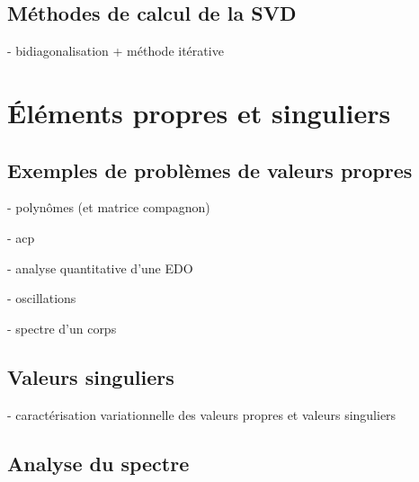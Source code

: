 \subsection{Méthodes de calcul de la SVD}

- bidiagonalisation + méthode itérative




\section{Éléments propres et singuliers}

\subsection{Exemples de problèmes de valeurs propres}

- polynômes (et matrice compagnon)

- acp

- analyse quantitative d'une EDO

- oscillations

- spectre d'un corps

\subsection{Valeurs singuliers}

- caractérisation variationnelle des valeurs propres et valeurs singuliers

\subsection{Analyse du spectre}


